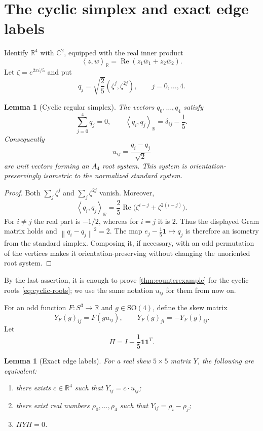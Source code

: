\documentclass[11pt,reqno]{amsart}
\newtheorem{lemma}[theorem]{Lemma}
\theoremstyle{remark}
\newcommand{\R}{\mathbb R}
\newcommand{\C}{\mathbb C}
\newcommand{\one}{\mathbf 1}
\newcommand{\SO}{\mathrm{SO}}
\newcommand{\ip}[2]{\left\langle #1,#2\right\rangle}
\newcommand{\norm}[1]{\left\lVert #1\right\rVert}
\begin{document}
\section{The cyclic simplex and exact edge labels}\label{sec:setup}

Identify $\R^4$ with $\C^2$, equipped with the real inner product
\[
 \ip{z}{w}_{\R}
 =\operatorname{Re}(z_1\overline w_1+z_2\overline w_2).
\]
Let $\zeta=e^{2\pi i/5}$ and put
\begin{equation}\label{eq:cyclic-simplex}
 q_j=\sqrt{\frac25}(\zeta^j,\zeta^{2j}),
 \qquad j=0,\dots,4.
\end{equation}

\begin{lemma}[Cyclic regular simplex]\label{lem:cyclic-simplex}
The vectors $q_0,\dots,q_4$ satisfy
\[
 \sum_{j=0}^4q_j=0,
 \qquad
 \ip{q_i}{q_j}_{\R}
 =\delta_{ij}-\frac15.
\]
Consequently
\begin{equation}\label{eq:cyclic-roots}
 u_{ij}=\frac{q_i-q_j}{\sqrt2}
\end{equation}
are unit vectors forming an $A_4$ root system.  This system is
orientation-preservingly isometric to the normalized standard system.
\end{lemma}

\begin{proof}
Both $\sum_j\zeta^j$ and $\sum_j\zeta^{2j}$ vanish.  Moreover,
\[
 \ip{q_i}{q_j}_{\R}
 =\frac25\operatorname{Re}\bigl(\zeta^{i-j}+\zeta^{2(i-j)}\bigr).
\]
For $i\ne j$ the real part is $-1/2$, whereas for $i=j$ it is $2$.
Thus the displayed Gram matrix holds and $\norm{q_i-q_j}^2=2$.
The map $e_j-\frac15\one\mapsto q_j$ is therefore an isometry from the
standard simplex.  Composing it, if necessary, with an odd permutation of the
vertices makes it orientation-preserving without changing the unoriented root
system.
\end{proof}

By the last assertion, it is enough to prove \cref{thm:counterexample} for
the cyclic roots \eqref{eq:cyclic-roots}; we use the same notation $u_{ij}$
for them from now on.

For an odd function $F\colon S^3\to\R$ and $g\in\SO(4)$, define the skew
matrix
\begin{equation}\label{eq:label-matrix}
 Y_F(g)_{ij}=F(gu_{ij}),
 \qquad Y_F(g)_{ji}=-Y_F(g)_{ij}.
\end{equation}
Let
\[
 \Pi=I-\frac15\one\one^T.
\]

\begin{lemma}[Exact edge labels]\label{lem:exact-labels}
For a real skew $5\times5$ matrix $Y$, the following are equivalent:
\begin{enumerate}
\item there exists $c\in\R^4$ such that $Y_{ij}=c\cdot u_{ij}$;
\item there exist real numbers $\rho_0,\dots,\rho_4$ such that
      $Y_{ij}=\rho_i-\rho_j$;
\item $\Pi Y\Pi=0$.
\end{enumerate}
\end{lemma}
\end{document}
